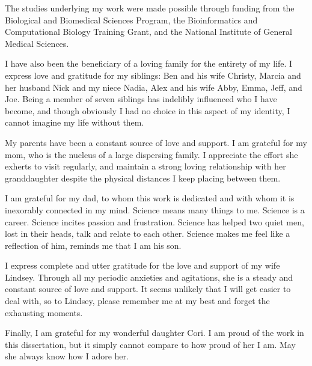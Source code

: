 The studies underlying my work were made possible through funding from the Biological and Biomedical Sciences Program, the Bioinformatics and Computational Biology Training Grant, and the National Institute of General Medical Sciences.

I have also been the beneficiary of a loving family for the entirety of my life. I express love and gratitude for my siblings: Ben and his wife Christy, Marcia and her husband Nick and my niece Nadia, Alex and his wife Abby, Emma, Jeff, and Joe. Being a member of seven siblings has indelibly influenced who I have become, and though obviously I had no choice in this aspect of my identity, I cannot imagine my life without them. 

My parents have been a constant source of love and support. I am grateful for my mom, who is the nucleus of a large dispersing family. I appreciate the effort she exherts to visit regularly, and maintain a strong loving relationship with her granddaughter despite the physical distances I keep placing between them. 

I am grateful for my dad, to whom this work is dedicated and with whom it is inexorably connected in my mind. Science means many things to me. Science is a career. Science incites passion and frustration. Science has helped two quiet men, lost in their heads, talk and relate to each other. Science makes me feel like a reflection of him, reminds me that I am his son.

I express complete and utter gratitude for the love and support of my wife Lindsey. Through all my periodic anxieties and agitations, she is a steady and constant source of love and support. It seems unlikely that I will get easier to deal with, so to Lindsey, please remember me at my best and forget the exhausting moments.

Finally, I am grateful for my wonderful daughter Cori. I am proud of the work in this dissertation, but it simply cannot compare to how proud of her I am. May she always know how I adore her.

\clearpage
